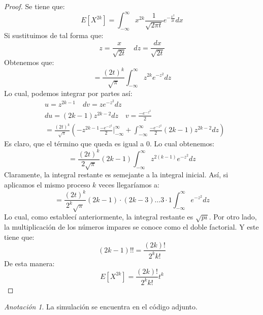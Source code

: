 \documentclass[11pt]{article}
\theoremstyle{definition}
\theoremstyle{remark}
\newtheorem{remark}{Anotación}
\theoremstyle{remark}
\begin{document}
\begin{proof}
  Se tiene que:
  \begin{equation*}
    E\left[X^{2k}\right] = \int_{-\infty}^{\infty}x^{2k}\frac{1}
    {\sqrt{2\pi t}}e^{-\frac{x^2}{2t}}dx
  \end{equation*}
  Si sustituimos de tal forma que:
  \begin{equation*}
    z = \frac{x}{\sqrt{2t}} \quad dz = \frac{dx}{\sqrt{2t}}
  \end{equation*}
  Obtenemos que:
  \begin{equation*}
    = \frac{(2t)^k}{\sqrt{\pi}} \int_{-\infty}^\infty z^{2k}e^{-z^2}dz
  \end{equation*}
  Lo cual, podemos integrar por partes así:
  \begin{equation*}
    \begin{split}
      &u = z^{2k - 1} \quad dv = ze^{-z^2}dz \\
      &du = (2k - 1)z^{2k-2}dz \quad v = \frac{-e^{-z^2}}{2} \\
      &= \frac{(2t)^k}{\sqrt{\pi}} \left(-z^{2k - 1}\frac{-e^{-z^2}}
        {2}\Bigg|_{-\infty}^\infty + \int_{-\infty}^\infty
        \frac{-e^{-z^2}}{2}(2k - 1)z^{2k-2}dz\right)
    \end{split}
  \end{equation*}
  Es claro, que el término que queda es igual a 0. Lo cual obtenemos:
  \begin{equation*}
    = \frac{(2t)^k}{2\sqrt{\pi}}(2k-1)\int_{-\infty}^{\infty}z^{2(k-1)}
    e^{-z^2}dz
  \end{equation*}
  Claramente, la integral restante es semejante a la integral inicial. Así, si aplicamos el mismo proceso $k$ veces llegaríamos a:
  \begin{equation*}
    = \frac{(2t)^k}{2^k\sqrt{\pi}}(2k - 1)\cdot(2k - 3) \dots 3
    \cdot 1 \int_{-\infty}^{\infty}e^{-z^2}dz
  \end{equation*}
  Lo cual, como establecí anteriormente, la integral restante es
  $\sqrt{pi}$. Por otro lado, la multiplicación de los números
  impares se conoce como el doble factorial. Y este tiene que:
  \begin{equation*}
    (2k - 1)!! = \frac{(2k)!}{2^kk!}
  \end{equation*}
  De esta manera:
  \begin{equation*}
    E\left[X^{2k}\right]= \frac{(2k)!}{2^kk!}t^k
  \end{equation*}
\end{proof}
\begin{remark}
  La simulación se encuentra en el código adjunto.
\end{remark}
\end{document}
